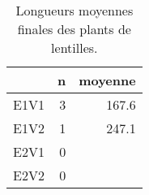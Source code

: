 \begin{table}[ht]
\centering
\begin{tabular}{rrr}
  \hline
 & n & moyenne \\ 
  \hline
E1V1 &  3 & 167.6 \\ 
  E1V2 &  1 & 247.1 \\ 
  E2V1 &  0 &  \\ 
  E2V2 &  0 &  \\ 
   \hline
\end{tabular}
\caption{Longueurs moyennes finales des plants de lentilles.} 
\label{tabtail}
\end{table}
